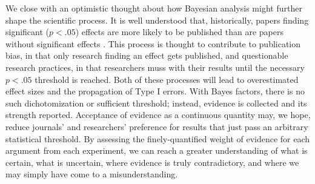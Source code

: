 \documentclass[fignum,nobf,man]{apa}
\begin{document}
We close with an optimistic thought about how Bayesian analysis might further shape the scientific process. It is well understood that, historically, papers finding significant ($p < .05$) effects are more likely to be published than are papers without significant effects \citep{Cooper:etal:1997,Atkinson:etal:1982}. This process is thought to contribute to publication bias, in that only research finding an effect gets published, and questionable research practices, in that researchers muss with their results until the necessary $p < .05$ threshold is reached. Both of these processes will lead to overestimated effect sizes and the propagation of Type I errors. %
With Bayes factors, there is no such dichotomization or sufficient threshold; instead, evidence is collected and its strength reported. Acceptance of evidence as a continuous quantity may, we hope, reduce journals' and researchers' preference for results that just pass an arbitrary statistical threshold. By assessing the finely-quantified weight of evidence for each argument from each experiment, we can reach a greater understanding of what is certain, what is uncertain, where evidence is truly contradictory, and where we may simply have come to a misunderstanding.


\newpage

\end{document}

